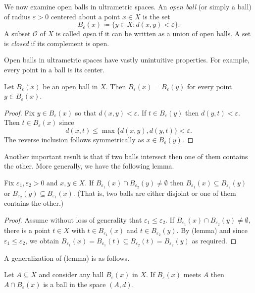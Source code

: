 We now examine open balls in ultrametric spaces. An \emph{open ball} (or simply a ball) of radius \( \varepsilon > 0 \) centered about a point \( x \in  X \) is the set \[ B_{\varepsilon }(x) \coloneqq \{ y \in X : d(x,y) < \varepsilon  \}.  \] A subset \( \mathcal{O}  \) of \( X \) is called \emph{open} if it can be written as a union of open balls. A set is \emph{closed} if its complement is open.

Open balls in ultrametric spaces have vastly unintuitive properties. For example, every point in a ball is its center.

\begin{lemma}
Let \( B_{\varepsilon } (x) \) be an open ball in \( X \). Then \( B_{\varepsilon } (x) = B_{\varepsilon } (y) \) for every point \( y \in B_{\varepsilon } (x) \).
\end{lemma}
\begin{proof}
Fix \( y \in B_{\varepsilon } (x) \) so that \( d(x,y) < \varepsilon  \). If \( t \in B_{\varepsilon } (y) \) then \( d(y,t) < \varepsilon  \). Then \( t \in B_{\varepsilon } (x) \) since \[ d(x, t) \leq \max \{ d(x,y), d(y,t) \} < \varepsilon . \] The reverse inclusion follows symmetrically as \( x \in B_{\varepsilon } (y) \).
\end{proof}
Another important result is that if two balls intersect then one of them contains the other. More generally, we have the following lemma.
\begin{lemma}
Fix \( \varepsilon_1, \varepsilon_2 > 0 \) and \( x, y \in X \). If \( B_{\varepsilon_1} (x) \cap B_{\varepsilon_2}(y) \neq \emptyset  \) then \( B_{\varepsilon_1} (x) \subseteq B_{\varepsilon_2} (y) \) or \( B_{\varepsilon_{2} }(y) \subseteq B_{\varepsilon_1} (x)  \). (That is, two balls are either disjoint or one of them contains the other.)
\end{lemma}
\begin{proof}
Assume without loss of generality that \( \varepsilon_1 \leq \varepsilon_2 \). If \( B_{\varepsilon_1} (x) \cap B_{\varepsilon_2} (y) \neq \emptyset \), there is a point \( t \in X \) with \( t \in B_{\varepsilon_1}(x) \) and \( t \in  B_{\varepsilon_2} (y)  \). By (lemma) and since \( \varepsilon_1 \leq \varepsilon_2 \), we obtain \( B_{\varepsilon_1} (x) = B_{\varepsilon_1} (t) \subseteq B_{\varepsilon_2} (t) = B_{\varepsilon_2} (y) \) as required.
\end{proof}
A generalization of (lemma) is as follows.
\begin{lemma}
Let \( A \subseteq X \) and consider any ball \(B_{\varepsilon } (x) \) in \( X \). If \( B_{\varepsilon } (x) \) meets \( A \) then \( A \cap B_{\varepsilon } (x) \) is a ball in the space \( (A, d) \).
\end{lemma}
